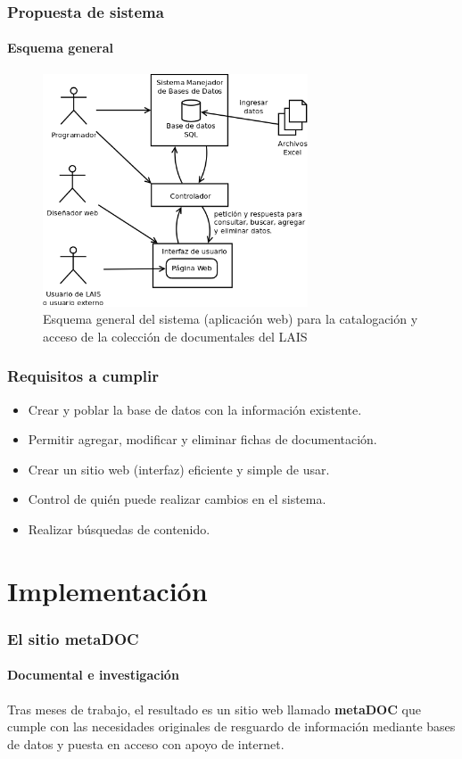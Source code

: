 \documentclass{beamer}
\begin{document}
\begin{frame}
	\frametitle{Propuesta de sistema}
	\framesubtitle{Esquema general}
	\begin{figure}[H]
		\centering
		\includegraphics[width=0.7\textwidth]{EsquemaGeneral.png}
		\caption{Esquema general del sistema (aplicación web) para la catalogación y acceso de la colección de documentales del LAIS}
		\label{fig:esquema_general}
	\end{figure}
\end{frame}


\begin{frame}
	\frametitle{Requisitos a cumplir}
	
	\begin{itemize}
		\item Crear y poblar la base de datos con la información existente.
		\item Permitir agregar, modificar y eliminar fichas de documentación.
		\item Crear un sitio web (interfaz) eficiente y simple de usar.
		\item Control de quién puede realizar cambios en el sistema.
		\item Realizar búsquedas de contenido.
	\end{itemize}
\end{frame}


\section{Implementación}
\begin{frame}
	\frametitle{El sitio metaDOC}
	\framesubtitle{Documental e investigación}
	Tras meses de trabajo, el resultado es un sitio web llamado \textbf{metaDOC} que cumple con las necesidades originales de resguardo de información mediante bases de datos y puesta en acceso con apoyo de internet.
\end{frame}
\end{document}
